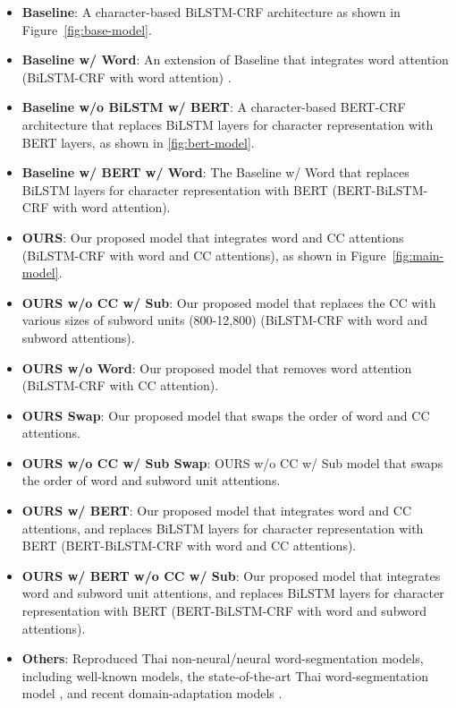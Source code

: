 \begin{itemize}
    \setlength\itemsep{0.01em}
    \item\textbf{Baseline}:
        A character-based BiLSTM-CRF architecture as shown in Figure~\ref{fig:base-model}.
    \item\textbf{Baseline w/ Word}:
        An extension of Baseline that integrates word attention (BiLSTM-CRF with word attention) \cite{higashiyama-etal-2019-incorporating}.
    \item\textbf{Baseline w/o BiLSTM w/ BERT}:
        A character-based BERT-CRF architecture that replaces BiLSTM layers for character representation with BERT layers, as shown in \ref{fig:bert-model}.
    \item\textbf{Baseline w/ BERT w/ Word}:
        The Baseline w/ Word that replaces BiLSTM layers for character representation with BERT (BERT-BiLSTM-CRF with word attention).
    \item\textbf{OURS}:
        Our proposed model that integrates word and CC attentions (BiLSTM-CRF with word and CC attentions), as shown in Figure~\ref{fig:main-model}.
    \item\textbf{OURS w/o CC w/ Sub}:
        Our proposed model that replaces the CC with various sizes of subword units (800-12,800) (BiLSTM-CRF with word and subword attentions).
    \item\textbf{OURS w/o Word}:
        Our proposed model that removes word attention (BiLSTM-CRF with CC attention).
    \item\textbf{OURS Swap}:
        Our proposed model that swaps the order of word and CC attentions.
    \item\textbf{OURS w/o CC w/ Sub Swap}: 
        OURS w/o CC w/ Sub model that swaps the order of word and subword unit attentions.
    \item\textbf{OURS w/ BERT}:
        Our proposed model that integrates word and CC attentions, and replaces BiLSTM layers for character representation with BERT (BERT-BiLSTM-CRF with word and CC attentions).
    \item\textbf{OURS w/ BERT w/o CC w/ Sub}:
        Our proposed model that integrates word and subword unit attentions, and replaces BiLSTM layers for character representation with BERT (BERT-BiLSTM-CRF with word and subword attentions).
    \item\textbf{Others}: Reproduced Thai non-neural/neural word-segmentation models, including well-known models, the state-of-the-art Thai word-segmentation model \cite{seeha-etal-2020-thailmcut}, and recent domain-adaptation models \cite{limkonchotiwat-etal-2020-domain,limkonchotiwat-etal-2021-handling}.
\end{itemize}

